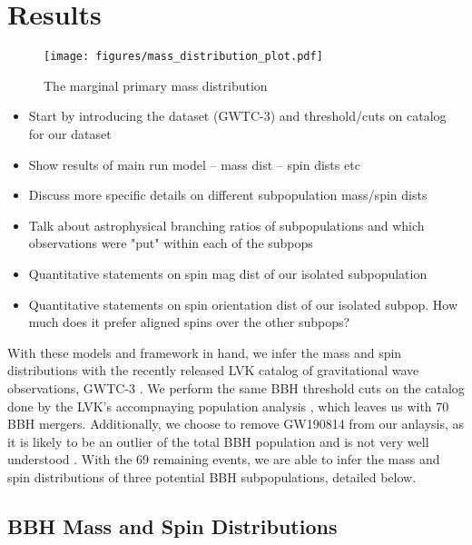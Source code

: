 \section{Results} \label{sec:results}

\begin{figure*}[ht!]
    \begin{centering}
        \texttt{[image: figures/mass\_distribution\_plot.pdf]}
        \caption{The marginal primary mass distribution}
        \label{fig:mass_distribution}
    \end{centering}
\end{figure*}


\begin{itemize}
    \item Start by introducing the dataset (GWTC-3) and threshold/cuts on catalog for our dataset
    \item Show results of main run model -- mass dist -- spin dists etc
    \item Discuss more specific details on different subpopulation mass/spin dists
    \item Talk about astrophysical branching ratios of subpopulations and which observations were "put" within each of the subpops
    \item Quantitative statements on spin mag dist of our isolated subpopulation
    \item Quantitative statements on spin orientation dist of our isolated subpop. How much does it prefer aligned spins over the other subpops?
\end{itemize}

With these models and framework in hand, we infer the mass and spin distributions with the recently released LVK catalog of gravitational wave observations, GWTC-3 . We perform the same BBH threshold cuts on the catalog done by the LVK's accompnaying population analysis , which leaves us with 70 BBH mergers. Additionally, we choose to remove GW190814 from our anlaysis, as it is likely to be an outlier of the total BBH population and is not very well understood . With the 69 remaining events, we are able to infer the mass and spin distributions of three potential BBH subpopulations, detailed below. 

\subsection{BBH Mass and Spin Distributions}

